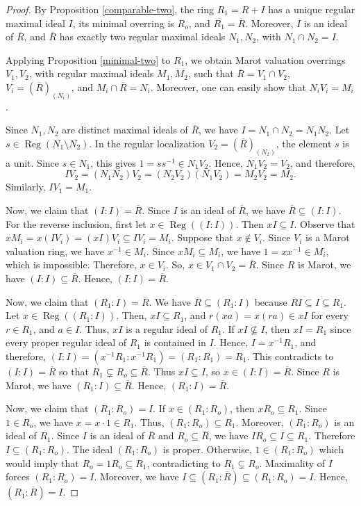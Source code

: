 \documentclass[12pt]{article}
\newcommand{\Reg}{\operatorname{Reg}}
\begin{document}
	\begin{proof}
		By Proposition \ref{comparable-two}, the ring $R_1=R+I$ has a unique regular maximal ideal $I$, its minimal overring is $R_o$, and $\overline{R_1}=\overline R$. Moreover, $I$ is an ideal of $\overline R$, and $\overline R$ has exactly two regular maximal ideals $N_1,N_2$, with $N_1\cap N_2=I$.
		
		Applying Proposition \ref{minimal-two} to $R_1$, we obtain Marot valuation overrings $V_1,V_2$, with regular maximal ideals $M_1,M_2$, such that $\overline R=V_1\cap V_2$, $V_i=(\overline R)_{(N_i)}$, and $M_i\cap\overline R=N_i$. Moreover, one can easily show that $N_iV_i=M_i$.
		
		Since $N_1,N_2$ are distinct maximal ideals of $\overline R$, we have $I=N_1\cap N_2=N_1N_2$. Let $s\in\Reg(N_1\setminus N_2)$. In the regular localization $V_2=(\overline R)_{(N_2)}$, the element $s$ is a unit. Since $s\in N_1$, this gives $1=ss^{-1}\in N_1V_2$. Hence, $N_1V_2=V_2$, and therefore, $$IV_2=(N_1N_2)V_2=(N_2V_2)(N_1V_2) =M_2V_2 =M_2.$$ Similarly, $IV_1=M_1$.
		
		\smallskip
		Now, we claim that $(I:I)=\overline R$. Since $I$ is an ideal of $\overline R$, we have $\overline R\subseteq(I:I)$. For the reverse inclusion, first let $x\in\Reg((I:I))$. Then $xI\subseteq I$. Observe that $xM_i=x(IV_i)=(xI)V_i\subseteq IV_i=M_i$. Suppose that $x\notin V_i$. Since $V_i$ is a Marot valuation ring, we have $x^{-1}\in M_i$. Since $xM_i\subseteq M_i$, we have $1=xx^{-1}\in M_i$, which is impossible. Therefore, $x\in V_i$. So, $x\in V_1\cap V_2=\overline R$. Since $R$ is Marot, we have $(I:I)\subseteq\overline R$. Hence, $(I:I)=\overline R$.
		
		\smallskip
		Now, we claim that $(R_1:I)=\overline R$. We have $\overline R\subseteq(R_1:I)$ because $\overline RI\subseteq I\subseteq R_1$. Let $x\in\Reg((R_1:I))$. Then, $xI\subseteq R_1$, and $r(xa)=x(ra)\in xI$ for every $r\in R_1$, and $a\in I$. Thus, $xI$ is a regular ideal of $R_1$. If $xI\nsubseteq I$, then $xI=R_1$ since every proper regular ideal of $R_1$ is contained in $I$. Hence, $I=x^{-1}R_1$, and therefore, $(I:I)=(x^{-1}R_1:x^{-1}R_1)=(R_1:R_1)=R_1.$ This contradicts to $(I:I)=\overline R$ so that $R_1\subsetneq R_o\subseteq\overline R$. Thus $xI\subseteq I$, so $x\in(I:I)=\overline R$. Since $R$ is Marot, we have $(R_1:I)\subseteq\overline R$. Hence, $(R_1:I)=\overline R$.
		
		\smallskip
		Now, we claim that $(R_1:R_o)=I$. If $x\in(R_1:R_o)$, then $xR_o\subseteq R_1$. Since $1\in R_o$, we have $x=x\cdot1\in R_1$. Thus, $(R_1:R_o)\subseteq R_1$. Moreover, $(R_1:R_o)$ is an ideal of $R_1$. Since $I$ is an ideal of $\overline R$ and $R_o\subseteq\overline R$, we have $IR_o\subseteq I\subseteq R_1$. Therefore $I\subseteq(R_1:R_o)$. The ideal $(R_1:R_o)$ is proper. Otherwise, $1\in(R_1:R_o)$ which would imply that $R_o=1R_o\subseteq R_1$, contradicting to $R_1\subsetneq R_o$. Maximality of $I$ forces $(R_1:R_o)=I$. Moreover, we have $I\subseteq(R_1:\overline R)\subseteq(R_1:R_o)=I$. Hence, $(R_1:\overline R)=I$.
		

\end{proof}
\end{document}
